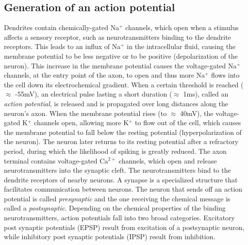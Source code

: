 \subsection{Generation of an action potential}
Dendrites contain chemically-gated Na$^{+}$ channels, which open when 
a stimulus affects a sensory receptor, such as neurotransmitters binding to the dendrite receptors. This leads to an influx of Na$^{+}$ in the intracellular fluid, causing the membrane potential to be less negative or to be positive (depolarization of the neuron). 
This increase in the membrane potential causes the voltage-gated Na$^{+}$ channels, at the entry point of the axon, to open and thus more Na$^{+}$ flows into the cell down its electrochemical  gradient. When a certain threshold is reached ($\approx$ -55mV), an electrical pulse lasting  a short duration ($\approx$ 1ms),  called an \textit{action potential}, is released and is propagated over long distances along the neuron's axon. When the membrane potential rises (to  $\approx$ 40mV), the voltage-gated K$^{+}$ channels open, allowing more K$^{+}$ to flow out of the cell, which causes
the membrane potential to fall below the resting potential (hyperpolarization of the neuron). The neuron later returns to its resting potential after a refractory period, during which the likelihood of spiking is greatly reduced.
The axon terminal contains voltage-gated Ca$^{2+}$ channels, which open and release neurotransmitters into the synaptic cleft. The neurotransmitters bind to the dendrite receptors of nearby neurons.
A synapse is a specialized structure that facilitates communication between neurons. The neuron that sends off an action potential is called \textit{presynaptic} and the one receiving the 
chemical message is called a \textit{postsynaptic}.
Depending on the chemical properties of the binding neurotransmitters, action potentials fall into two broad categories. Excitatory post synaptic potentials (EPSP) result from excitation of a postsynaptic neuron, while inhibitory post synaptic potentials (IPSP) result from inhibition.

